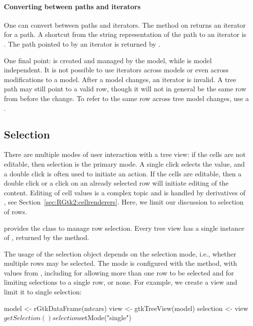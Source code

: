 \paragraph{Converting between paths and iterators}
One can convert between paths and iterators. The method
 on  returns an
iterator for a path. A shortcut from the string representation of the
path to an iterator is . The
path pointed to by an iterator is returned by
.

One final point:  is created and managed by the
model, while  is model independent. It is not
possible to use iterators across models or even across modifications
to a model. After a model changes, an iterator is invalid. A tree path
may still point to a valid row, though it will not in general be the
same row from before the change. To refer to the same row across tree
model changes, use a .

\subsection{Selection}

There are multiple modes of user interaction with a tree view: if the
cells are not editable, then selection is the primary mode.  A single
click selects the value, and a double click is often used to initiate
an action. If the cells are editable, then a double click or a click
on an already selected row will initiate editing of the
content. Editing of cell values is a complex topic and is handled by
derivatives of , see
Section~\ref{sec:RGtk2:cellrenderers}. Here, we limit our discussion
to selection of rows.

\GTK\/ provides the class  to manage row
selection. Every tree view has a single instance of
, returned by the
 method.

The usage of the selection object depends on the selection mode, i.e.,
whether multiple rows may be selected. The mode is configured with the
 method, with values from
, including  for allowing more
than one row to be selected and  for limiting selections
to a single row, or none. For example, we create a view and limit it
to single selection:
\begin{Schunk}
\begin{Sinput}
 model <- rGtkDataFrame(mtcars)
 view <- gtkTreeView(model)
 selection <- view$getSelection()
 selection$setMode("single")
\end{Sinput}
\end{Schunk}

